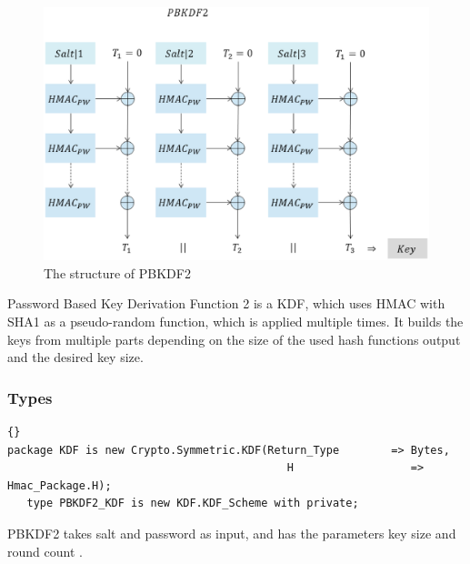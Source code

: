 \begin{figure}[ht!]
\centering
\includegraphics[width=150mm]{./images/PBKDF2}
\caption{The structure of PBKDF2}
\end{figure}

Password Based Key Derivation Function 2 is a KDF, which uses HMAC with SHA1 as a pseudo-random function, which is applied multiple times. It builds the keys from multiple parts depending on the size of the used hash functions output and the desired key size. 
\subsubsection*{Types}
\begin{lstlisting}{}
package KDF is new Crypto.Symmetric.KDF(Return_Type        => Bytes,
                                           H                  => Hmac_Package.H);
   type PBKDF2_KDF is new KDF.KDF_Scheme with private;

\end{lstlisting}
PBKDF2 takes salt and password as input, and has the parameters key size and round count .

